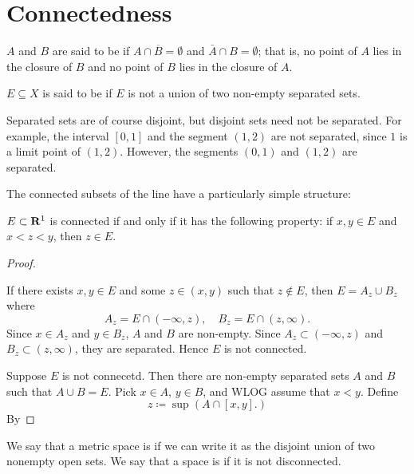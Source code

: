\section{Connectedness}
\begin{definition}[Connectedness]
$A$ and $B$ are said to be  if $A\cap\overline{B}=\emptyset$ and $\bar{A}\cap B=\emptyset$; that is, no point of $A$ lies in the closure of $B$ and no point of $B$ lies in the closure of $A$.

$E\subseteq X$ is said to be  if $E$ is not a union of two non-empty separated sets. 
\end{definition}

\begin{remark}
Separated sets are of course disjoint, but disjoint sets need not be separated. For example, the interval $[0,1]$ and the segment $(1,2)$ are not separated, since $1$ is a limit point of $(1,2)$. However, the segments $(0,1)$ and $(1,2)$ are separated.
\end{remark}

The connected subsets of the line have a particularly simple structure: 

\begin{proposition}
$E\subset\mathbf R^1$ is connected if and only if it has the following property: if $x,y\in E$ and $x<z<y$, then $z\in E$.
\end{proposition}

\begin{proof} \

\fbox{$\impliedby$} If there exists $x,y\in E$ and some $z\in(x,y)$ such that $z\notin E$, then $E=A_z\cup B_z$ where
\[ A_z=E\cap(-\infty,z), \quad B_z=E\cap(z,\infty). \]
Since $x\in A_z$ and $y\in B_z$, $A$ and $B$ are non-empty. Since $A_z\subset(-\infty,z)$ and $B_z\subset(z,\infty)$, they are separated. Hence $E$ is not connected.

\fbox{$\implies$} Suppose $E$ is not connecetd. Then there are non-empty separated sets $A$ and $B$ such that $A\cup B=E$. Pick $x\in A$, $y\in B$, and WLOG assume that $x<y$. Define
\[z\coloneqq\sup(A\cap[x,y].)\]
By 
\end{proof}

\begin{definition}
We say that a metric space is  if we can write it as the disjoint union of two nonempty open sets. We say that a space is  if it is not disconnected.
\end{definition}

